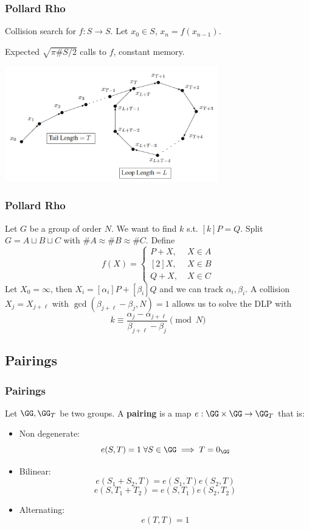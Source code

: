 \documentclass{beamer}
\begin{document}
\begin{frame}
    \frametitle{Pollard Rho}
    Collision search for $f: S \to S$. Let $x_0 \in S$, $x_n = f(x_{n-1})$.
    
    Expected $\sqrt{\pi \#S/2}$ calls to $f$, constant memory.
    \begin{center}
        \includegraphics[width=25em]{pollard_rho.PNG}
    \end{center}
\end{frame}

\begin{frame}
    \frametitle{Pollard Rho}
    Let $G$ be a group of order $N$. We want to find $k$ s.t. $[k]P = Q$.
    Split $G = A \sqcup B \sqcup C$ with $\# A \approx \# B \approx \#C$.
    Define 
    \[ f(X) = \begin{cases}
        P + X, \; &X \in A \\
        [2]X, \; &X \in B \\
        Q + X, \; &X \in C
    \end{cases} \]
    Let $X_0 = \infty$, then $X_i = [\alpha_i] P + [\beta_i] Q$ and we can track $\alpha_i, \beta_i$. 
    A collision $X_j = X_{j+\ell}$ with $\gcd(\beta_{j+\ell} - \beta_j, N) = 1$ allows us to solve the DLP with
    \[ k \equiv \frac{\alpha_j - \alpha_{j + \ell}}{\beta_{j+\ell} - \beta_j} \pmod{N} \]

\end{frame}

\subsection{Pairings}
\begin{frame}
    \frametitle{Pairings}
    \begin{definition}
        Let $\GG, \GG_T$ be two groups. A \textbf{pairing} is a map $e: \GG \times \GG \to \GG_T$ that is:
        \begin{itemize}
            \item Non degenerate: 
            \[ e(S, T) = 1 \; \forall S \in \GG \implies T = 0_{\GG}  \]
            \item Bilinear:
            \[ e(S_1 + S_2, T) = e(S_1, T)e(S_2, T)\]
            \[ e(S, T_1 + T_2) = e(S, T_1)e(S_2, T_2)\]
            \item Alternating:
            \[ e(T, T) = 1 \]
            
        \end{itemize}
    \end{definition}
\end{frame}
\end{document}
